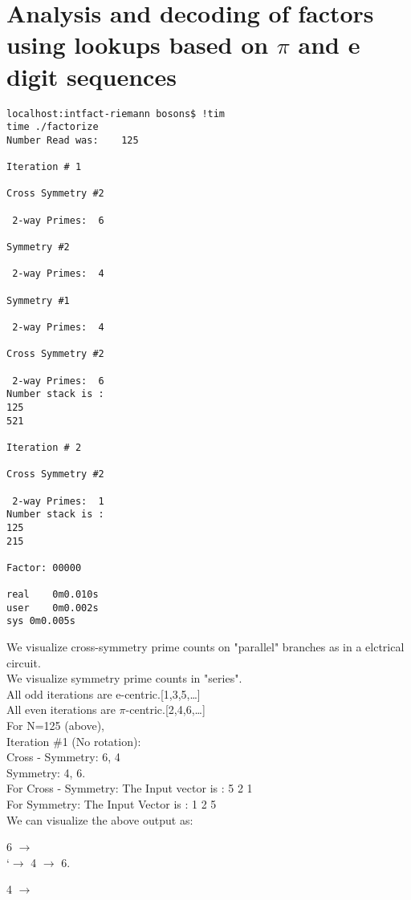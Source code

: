 \section{Analysis and decoding of factors using lookups based on $\pi$ and e digit sequences}
\begin{verbatim}
localhost:intfact-riemann bosons$ !tim
time ./factorize
Number Read was: 	125

Iteration #	1

Cross Symmetry #2

 2-way Primes: 	6

Symmetry #2

 2-way Primes: 	4

Symmetry #1

 2-way Primes: 	4

Cross Symmetry #2

 2-way Primes: 	6
Number stack is :
125
521

Iteration #	2

Cross Symmetry #2

 2-way Primes: 	1
Number stack is :
125
215

Factor:	00000

real	0m0.010s
user	0m0.002s
sys	0m0.005s
\end{verbatim}

We visualize cross-symmetry prime counts on "parallel" branches as in a elctrical circuit.\\
We visualize symmetry prime counts in "series".\\
All odd iterations are e-centric.[1,3,5,\ldots]\\
All even iterations are $\pi$-centric.[2,4,6,\ldots]\\
For N=125 (above),\\
Iteration \#1 (No rotation):\\
Cross - Symmetry: 6, 4\\
Symmetry: 4, 6.\\

For Cross - Symmetry: The Input vector is : 5 2 1\\
For Symmetry: The Input Vector is : 1 2 5 \\

We can visualize the above output as:\\

\raggedright 6 $\rightarrow$\\
      \raggedleft`$\rightarrow$ 4 $\rightarrow$ 6.\\
\raggedright 4 $\rightarrow$\\


